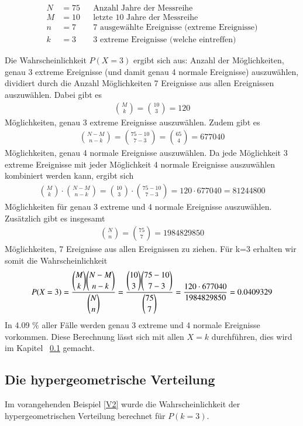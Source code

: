 \begin{refsection}
\begin{align*}
N&=75&&\text{Anzahl Jahre der Messreihe}\\
M&=10&&\text{letzte 10 Jahre der Messreihe}\\
n&=7&&\text{7 ausgewählte Ereignisse (extreme Ereignisse)}\\
k&=3&&\text{3 extreme Ereignisse (welche eintreffen)}
\end{align*}

Die Wahrscheinlichkeit $P(X=3)$ ergibt sich aus:
Anzahl der Möglichkeiten, genau 3 extreme Ereignisse (und damit genau 4 normale Ereignisse) auszuwählen, dividiert durch die Anzahl Möglichkeiten 7 Ereignisse aus allen Ereignissen auszuwählen. Dabei gibt es
\begin{align*}
\binom{M}{k} = \binom{10}{3} = 120
\end{align*}
%
Möglichkeiten, genau 3 extreme Ereignisse auszuwählen.
Zudem gibt es 
\begin{align*}
\binom{N-M}{n-k} = \binom{75-10}{7-3} = \binom{65}{4} = 677040
\end{align*}
%
Möglichkeiten, genau 4 normale Ereignisse auszuwählen.
Da jede Möglichkeit 3 extreme Ereignisse mit jeder Möglichkeit 4 normale Ereignisse auszuwählen kombiniert werden kann, ergibt sich
\begin{align*}
\binom{M}{k} \cdot \binom{N-M}{n-k} = \binom{10}{3} \cdot \binom{75-10}{7-3} = 120 
\cdot 677040 = 81244800
\end{align*}
%
Möglichkeiten für genau 3 extreme und 4 normale Ereignisse auszuwählen.
Zusätzlich gibt es insgesamt
\begin{align*}
\binom{N}{n} = \binom{75}{7} = 1984829850
\end{align*}
%
Möglichkeiten, 7 Ereignisse aus allen Ereignissen zu ziehen.
Für k=3 erhalten wir somit die Wahrscheinlichkeit
\begin{equation}
P(X = 3) = \frac{\displaystyle \binom{M}{k} \binom{N-M}{n-k}}{\displaystyle \binom{N}{n} }  \\
= \frac{\displaystyle \binom{10}{3} \binom{75-10}{7-3}}{\displaystyle \binom{75}{7} } \\
= \frac{ 120 \cdot 677040}{ 1984829850 } = 0.0409329 
\label {V2}
\end{equation}
%
In 4.09 \% aller Fälle werden genau 3 extreme und 4 normale Ereignisse vorkommen. Diese Berechnung lässt sich mit allen $X=k$ durchführen, dies wird im Kapitel ~\ref{Dichtehyper}  gemacht.


\subsection{Die hypergeometrische Verteilung} \label{Dichtehyper}
Im vorangehenden Beispiel \eqref{V2} wurde die Wahrscheinlichkeit der hypergeometrischen Verteilung berechnet für $P(k = 3)$. 


\end{refsection}
